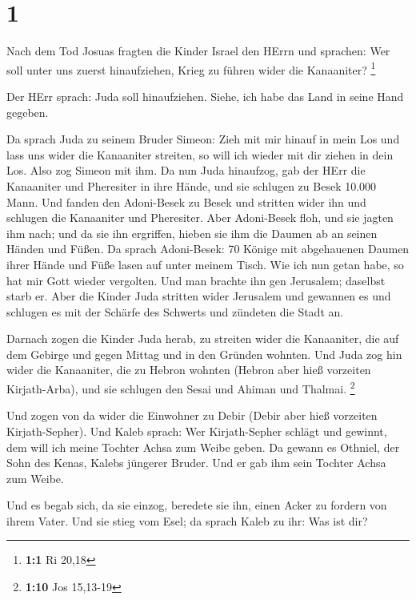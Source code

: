 \hypertarget{section}{%
\section{1}\label{section}}

 Nach dem Tod Josuas fragten die Kinder Israel den HErrn und
sprachen: Wer soll unter uns zuerst hinaufziehen, Krieg zu führen wider
die Kanaaniter? \footnote{\textbf{1:1} Ri 20,18}

 Der HErr sprach: Juda soll hinaufziehen. Siehe, ich habe
das Land in seine Hand gegeben.

 Da sprach Juda zu seinem Bruder Simeon: Zieh mit mir hinauf
in mein Los und lass uns wider die Kanaaniter streiten, so will ich
wieder mit dir ziehen in dein Los. Also zog Simeon mit ihm. 
Da nun Juda hinaufzog, gab der HErr die Kanaaniter und Pheresiter in
ihre Hände, und sie schlugen zu Besek 10.000 Mann.  Und
fanden den Adoni-Besek zu Besek und stritten wider ihn und schlugen die
Kanaaniter und Pheresiter.  Aber Adoni-Besek floh, und sie
jagten ihm nach; und da sie ihn ergriffen, hieben sie ihm die Daumen ab
an seinen Händen und Füßen.  Da sprach Adoni-Besek: 70
Könige mit abgehauenen Daumen ihrer Hände und Füße lasen auf unter
meinem Tisch. Wie ich nun getan habe, so hat mir Gott wieder vergolten.
Und man brachte ihn gen Jerusalem; daselbst starb er.  Aber
die Kinder Juda stritten wider Jerusalem und gewannen es und schlugen es
mit der Schärfe des Schwerts und zündeten die Stadt an.

 Darnach zogen die Kinder Juda herab, zu streiten wider die
Kanaaniter, die auf dem Gebirge und gegen Mittag und in den Gründen
wohnten.  Und Juda zog hin wider die Kanaaniter, die zu
Hebron wohnten (Hebron aber hieß vorzeiten Kirjath-Arba), und sie
schlugen den Sesai und Ahiman und Thalmai. \footnote{\textbf{1:10} Jos
  15,13-19}

 Und zogen von da wider die Einwohner zu Debir (Debir aber
hieß vorzeiten Kirjath-Sepher).  Und Kaleb sprach: Wer
Kirjath-Sepher schlägt und gewinnt, dem will ich meine Tochter Achsa zum
Weibe geben.  Da gewann es Othniel, der Sohn des Kenas,
Kalebs jüngerer Bruder. Und er gab ihm sein Tochter Achsa zum Weibe.

 Und es begab sich, da sie einzog, beredete sie ihn, einen
Acker zu fordern von ihrem Vater. Und sie stieg vom Esel; da sprach
Kaleb zu ihr: Was ist dir?

